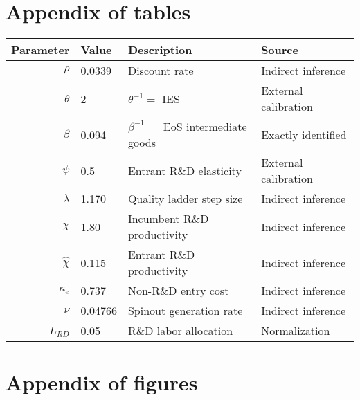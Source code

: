 \documentclass[11pt,english]{article}
\begin{document}


\appendix


\section{Appendix of tables}

\setcounter{table}{0}
\renewcommand{\thetable}{\Alph{section}\arabic{table}}









\begin{table}[!htb]
	\centering
	\label{calibration_2_parameters}
	\begin{tabular}{rlll}
		\toprule \toprule
		Parameter & Value & Description & Source \tabularnewline
		\midrule
		$\rho$ & 0.0339 & Discount rate  & Indirect inference \tabularnewline
		$\theta$ & 2 & $\theta^{-1} = $ IES & External calibration 
		\tabularnewline
		$\beta$ & 0.094 & $\beta^{-1} = $ EoS intermediate goods & Exactly identified \tabularnewline 
		$\psi$ & 0.5 & Entrant R\&D elasticity & External calibration \tabularnewline
		$\lambda$ & 1.170 & Quality ladder step size & Indirect inference 
		\tabularnewline
		$\chi$ & 1.80 & Incumbent R\&D productivity & Indirect inference 
		\tabularnewline
		$\hat{\chi}$ & 0.115 & Entrant R\&D productivity & Indirect inference \tabularnewline 
		$\kappa_e$ & 0.737 & Non-R\&D entry cost & Indirect inference \tabularnewline
		$\nu$ & 0.04766 & Spinout generation rate  & Indirect inference\tabularnewline
		$\bar{L}_{RD}$ & 0.05 & R\&D labor allocation  & Normalization \tabularnewline
		\bottomrule
	\end{tabular}
\end{table}



\newpage
\section{Appendix of figures}
\end{document}
